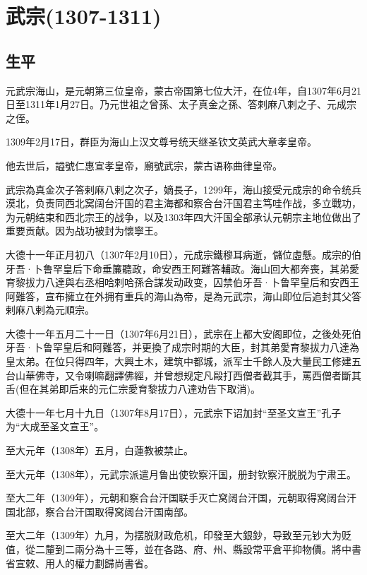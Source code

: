 
\section{武宗\tiny(1307-1311)}

\subsection{生平}

元武宗海山，是元朝第三位皇帝，蒙古帝国第七位大汗，在位4年，自1307年6月21日至1311年1月27日。乃元世祖之曾孫、太子真金之孫、答剌麻八剌之子、元成宗之侄。

1309年2月17日，群臣为海山上汉文尊号统天继圣钦文英武大章孝皇帝。

他去世后，謚號仁惠宣孝皇帝，廟號武宗，蒙古语称曲律皇帝。

武宗為真金次子答剌麻八剌之次子，嫡長子，1299年，海山接受元成宗的命令统兵漠北，负责同西北窝阔台汗国的君主海都和察合台汗国君主笃哇作战，多立戰功，为元朝结束和西北宗王的战争，以及1303年四大汗国全部承认元朝宗主地位做出了重要贡献。因为战功被封为懷寧王。

大德十一年正月初八（1307年2月10日），元成宗鐵穆耳病逝，儲位虛懸。成宗的伯牙吾·卜鲁罕皇后下命垂簾聽政，命安西王阿難答輔政。海山回大都奔喪，其弟愛育黎拔力八達與右丞相哈剌哈孫合謀发动政变，囚禁伯牙吾·卜鲁罕皇后和安西王阿難答，宣布擁立在外拥有重兵的海山為帝，是為元武宗，海山即位后追封其父答剌麻八剌為元順宗。

大德十一年五月二十一日（1307年6月21日），武宗在上都大安阁即位，之後处死伯牙吾·卜鲁罕皇后和阿難答，并更換了成宗时期的大臣，封其弟愛育黎拔力八達為皇太弟。在位只得四年，大興土木，建筑中都城，派军士千餘人及大量民工修建五台山華佛寺，又令喇嘛翻譯佛經，并曾想规定凡毆打西僧者截其手，罵西僧者斷其舌(但在其弟即后来的元仁宗愛育黎拔力八達劝告下取消)。

大德十一年七月十九日（1307年8月17日），元武宗下诏加封“至圣文宣王”孔子为“大成至圣文宣王”。

至大元年（1308年）五月，白蓮教被禁止。

至大元年（1308年），元武宗派遣月鲁出使钦察汗国，册封钦察汗脱脱为宁肃王。

至大二年（1309年），元朝和察合台汗国联手灭亡窝阔台汗国，元朝取得窝阔台汗国北部，察合台汗国取得窝阔台汗国南部。

至大二年（1309年）九月，为摆脱财政危机，印發至大銀鈔，导致至元钞大为贬值，從二釐到二兩分為十三等，並在各路、府、州、縣設常平倉平抑物價。將中書省宣敕、用人的權力劃歸尚書省。

